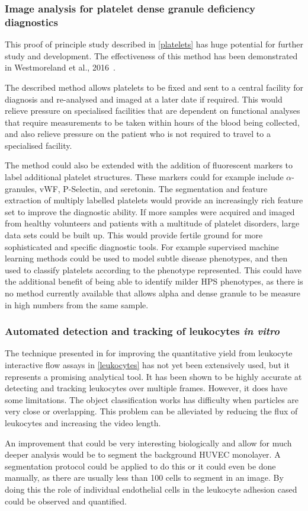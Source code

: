 \subsubsection{Image analysis for platelet dense granule deficiency diagnostics}
This proof of principle study described in \autoref{platelets} has huge potential for further study and development. The effectiveness of this method has been demonstrated in Westmoreland et al., 2016~\cite{Westmoreland2016}.

The described method allows platelets to be fixed and sent to a central facility for diagnosis and re-analysed and imaged at a later date if required. This would relieve pressure on specialised facilities that are dependent on functional analyses that require measurements to be taken within hours of the blood being collected, and also relieve pressure on the patient who is not required to travel to a specialised facility. 

The method could also be extended with the addition of fluorescent markers to label additional platelet structures. These markers could for example include $\alpha$-granules, vWF, P-Selectin, and seretonin. The segmentation and feature extraction of multiply labelled platelets would provide an increasingly rich feature set to improve the diagnostic ability. If more samples were acquired and imaged from healthy volunteers and patients with a multitude of platelet disorders, large data sets could be built up. This would provide fertile ground for more sophisticated and specific diagnostic tools. For example supervised machine learning methods could be used to model subtle disease phenotypes, and then used to classify platelets according to the phenotype represented. This could have the additional benefit of being able to identify milder HPS phenotypes, as there is no method currently available that allows alpha and dense granule to be measure in high numbers from the same sample.

\subsubsection{Automated detection and tracking of leukocytes \emph{in vitro}}
The technique presented in for improving the quantitative yield from leukocyte interactive flow assays in \autoref{leukocytes} has not yet been extensively used, but it represents a promising analytical tool. It has been shown to be highly accurate at detecting and tracking leukocytes over multiple frames. However, it does have some limitations. The object classification works has difficulty when particles are very close or overlapping. This problem can be alleviated by reducing the flux of leukocytes and increasing the video length.

An improvement that could be very interesting biologically and allow for much deeper analysis would be to segment the background HUVEC monolayer. A segmentation protocol could be applied to do this or it could even be done manually, as there are usually less than 100 cells to segment in an image. By doing this the role of individual endothelial cells in the leukocyte adhesion cased could be observed and quantified.
